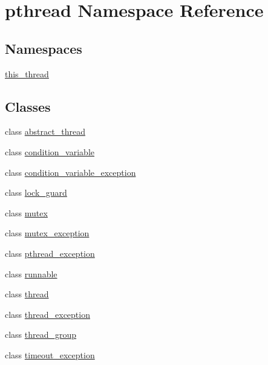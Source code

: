 \hypertarget{namespacepthread}{\section{pthread Namespace Reference}
\label{namespacepthread}
}
\subsection*{Namespaces}
\begin{DoxyCompactItemize}
\item 
 \hyperlink{namespacepthread_1_1this__thread}{this\+\_\+thread}
\end{DoxyCompactItemize}
\subsection*{Classes}
\begin{DoxyCompactItemize}
\item 
class \hyperlink{classpthread_1_1abstract__thread}{abstract\+\_\+thread}
\item 
class \hyperlink{classpthread_1_1condition__variable}{condition\+\_\+variable}
\item 
class \hyperlink{classpthread_1_1condition__variable__exception}{condition\+\_\+variable\+\_\+exception}
\item 
class \hyperlink{classpthread_1_1lock__guard}{lock\+\_\+guard}
\item 
class \hyperlink{classpthread_1_1mutex}{mutex}
\item 
class \hyperlink{classpthread_1_1mutex__exception}{mutex\+\_\+exception}
\item 
class \hyperlink{classpthread_1_1pthread__exception}{pthread\+\_\+exception}
\item 
class \hyperlink{classpthread_1_1runnable}{runnable}
\item 
class \hyperlink{classpthread_1_1thread}{thread}
\item 
class \hyperlink{classpthread_1_1thread__exception}{thread\+\_\+exception}
\item 
class \hyperlink{classpthread_1_1thread__group}{thread\+\_\+group}
\item 
class \hyperlink{classpthread_1_1timeout__exception}{timeout\+\_\+exception}
\end{DoxyCompactItemize}
